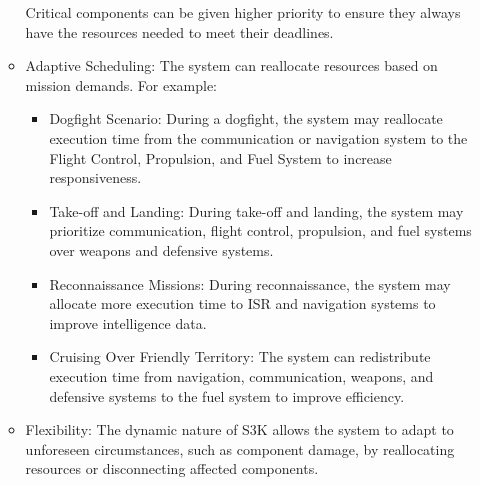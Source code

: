 \begin{itemize}
\begin{itemize}
				Critical components can be given higher priority to ensure they always have the resources needed to meet their deadlines.
			\item Adaptive Scheduling: 
				The system can reallocate resources based on mission demands. For example:
				\begin{itemize}
					\item Dogfight Scenario: 
						During a dogfight, the system may reallocate execution time from the communication or navigation system to the Flight Control, Propulsion, and Fuel System to increase responsiveness.
					\item Take-off and Landing: 
						During take-off and landing, the system may prioritize communication, flight control, propulsion, and fuel systems over weapons and defensive systems.
					\item Reconnaissance Missions: 
						During reconnaissance, the system may allocate more execution time to ISR and navigation systems to improve intelligence data.
					\item Cruising Over Friendly Territory: 
						The system can redistribute execution time from navigation, communication, weapons, and defensive systems to the fuel system to improve efficiency.
				\end{itemize}
			\item Flexibility: 
				The dynamic nature of S3K allows the system to adapt to unforeseen circumstances, such as component damage, by reallocating resources or disconnecting affected components.
		\end{itemize}


\end{itemize}
